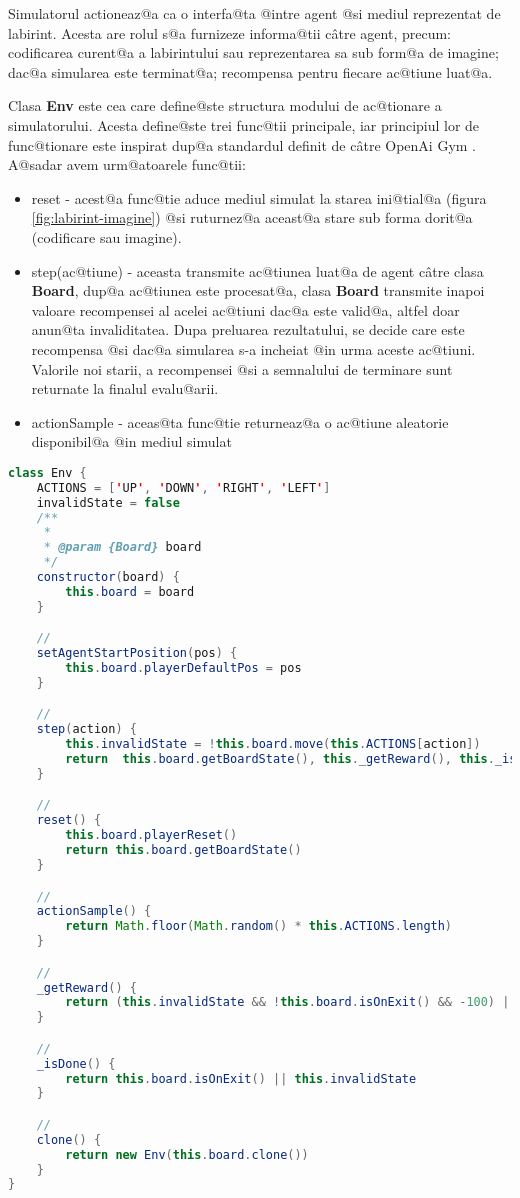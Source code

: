 Simulatorul actioneaz@a ca o interfa@ta @intre agent @si mediul reprezentat de labirint. Acesta are rolul s@a furnizeze informa@tii c\^ atre agent, precum: codificarea curent@a a labirintului sau reprezentarea sa sub form@a de imagine; dac@a simularea este terminat@a; recompensa pentru fiecare ac@tiune luat@a.

Clasa \textbf{Env} este cea care define@ste structura modului de ac@tionare a simulatorului. Acesta define@ste trei func@tii principale, iar principiul lor de func@tionare este inspirat dup@a standardul definit de c\^ atre OpenAi Gym \cite{open-ai-gym-env-format}. A@sadar avem urm@atoarele func@tii:

\begin{itemize}
	\item reset - acest@a func@tie aduce mediul simulat la starea ini@tial@a (figura \ref{fig:labirint-imagine}) @si ruturnez@a aceast@a stare sub forma dorit@a (codificare sau imagine).
	\item step(ac@tiune) - aceasta transmite ac@tiunea luat@a de agent c\^ atre clasa \textbf{Board}, dup@a ac@tiunea este procesat@a, clasa \textbf{Board} transmite inapoi valoare recompensei al acelei ac@tiuni dac@a este valid@a, altfel doar anun@ta invaliditatea. Dupa preluarea rezultatului, se decide care este recompensa @si dac@a simularea s-a incheiat @in urma aceste ac@tiuni. Valorile noi starii, a recompensei @si a semnalului de terminare sunt returnate la finalul evalu@arii.
	\item actionSample - aceas@ta func@tie returneaz@a o ac@tiune aleatorie disponibil@a @in mediul simulat
\end{itemize}



\begin{lstlisting}[language=Java, caption=Definirea clasei Env]
class Env {
    ACTIONS = ['UP', 'DOWN', 'RIGHT', 'LEFT']
    invalidState = false
    /**
     * 
     * @param {Board} board 
     */
    constructor(board) {
        this.board = board
    }

    //
    setAgentStartPosition(pos) {
        this.board.playerDefaultPos = pos
    }

    // 
    step(action) {
        this.invalidState = !this.board.move(this.ACTIONS[action])
        return  this.board.getBoardState(), this._getReward(), this._isDone()]
    }

    //
    reset() {
        this.board.playerReset()
        return this.board.getBoardState()
    }

    //
    actionSample() {
        return Math.floor(Math.random() * this.ACTIONS.length)
    }

    //
    _getReward() {
        return (this.invalidState && !this.board.isOnExit() && -100) || this.board.getPlayerCellValue()
    }

    //
    _isDone() {
        return this.board.isOnExit() || this.invalidState
    }

    //
    clone() {
        return new Env(this.board.clone())
    }
}
\end{lstlisting}


